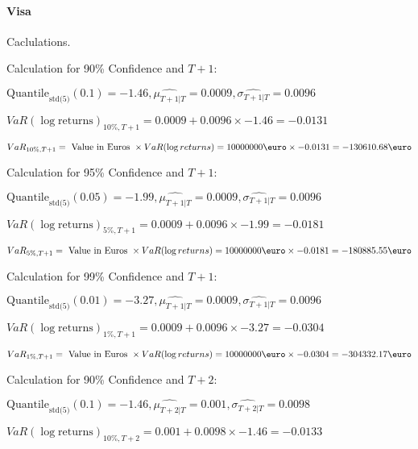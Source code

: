 \paragraph{Visa} Caclulations.\newline \indent 




Calculation for 90\% Confidence and $T+1$:

\indent\indent $\text{Quantile}_\text{std(5)}(0.1) = -1.46,\hat{\mu_{T+1|T}} = 0.0009, \hat{\sigma_{T+1|T}} = 0.0096$

\indent\indent $VaR(\log \text{returns})_{10\%, T + 1} = 0.0009 + 0.0096\times-1.46 = -0.0131$

\indent\indent $VaR_{10\%, T + 1} = \text{ Value in Euros } \times VaR(\log returns) = 10 000 000 \text{\euro} \times-0.0131 = -130610.68 \text{\euro}$\newline




Calculation for 95\% Confidence and $T+1$:

\indent\indent $\text{Quantile}_\text{std(5)}(0.05) = -1.99,\hat{\mu_{T+1|T}} = 0.0009, \hat{\sigma_{T+1|T}} = 0.0096$

\indent\indent $VaR(\log \text{returns})_{5\%, T + 1} = 0.0009 + 0.0096\times-1.99 = -0.0181$

\indent\indent $VaR_{5\%, T + 1} = \text{ Value in Euros } \times VaR(\log returns) = 10 000 000 \text{\euro} \times-0.0181 = -180885.55 \text{\euro}$\newline




Calculation for 99\% Confidence and $T+1$:

\indent\indent $\text{Quantile}_\text{std(5)}(0.01) = -3.27,\hat{\mu_{T+1|T}} = 0.0009, \hat{\sigma_{T+1|T}} = 0.0096$

\indent\indent $VaR(\log \text{returns})_{1\%, T + 1} = 0.0009 + 0.0096\times-3.27 = -0.0304$

\indent\indent $VaR_{1\%, T + 1} = \text{ Value in Euros } \times VaR(\log returns) = 10 000 000 \text{\euro} \times-0.0304 = -304332.17 \text{\euro}$\newline




Calculation for 90\% Confidence and $T+2$:

\indent\indent $\text{Quantile}_\text{std(5)}(0.1) = -1.46,\hat{\mu_{T+2|T}} = 0.001, \hat{\sigma_{T+2|T}} = 0.0098$

\indent\indent $VaR(\log \text{returns})_{10\%, T + 2} = 0.001 + 0.0098\times-1.46 = -0.0133$

